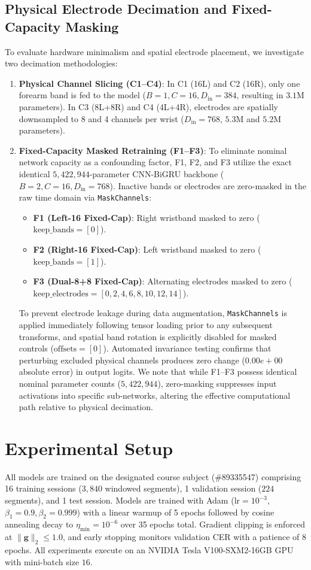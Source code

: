 \documentclass{article}
\begin{document}
\subsection{Physical Electrode Decimation and Fixed-Capacity Masking}
To evaluate hardware minimalism and spatial electrode placement, we investigate two decimation methodologies:
\begin{enumerate}
    \item \textbf{Physical Channel Slicing (C1--C4)}: In C1 (16L) and C2 (16R), only one forearm band is fed to the model ($B=1, C=16, D_{\text{in}}=384$, resulting in $3.1\text{M}$ parameters). In C3 (8L+8R) and C4 (4L+4R), electrodes are spatially downsampled to 8 and 4 channels per wrist ($D_{\text{in}}=768$, $5.3\text{M}$ and $5.2\text{M}$ parameters).
    \item \textbf{Fixed-Capacity Masked Retraining (F1--F3)}: To eliminate nominal network capacity as a confounding factor, F1, F2, and F3 utilize the exact identical $5{,}422{,}944$-parameter CNN-BiGRU backbone ($B=2, C=16, D_{\text{in}}=768$). Inactive bands or electrodes are zero-masked in the raw time domain via \texttt{MaskChannels}:
    \begin{itemize}
        \item \textbf{F1 (Left-16 Fixed-Cap)}: Right wristband masked to zero ($\text{keep\_bands}=[0]$).
        \item \textbf{F2 (Right-16 Fixed-Cap)}: Left wristband masked to zero ($\text{keep\_bands}=[1]$).
        \item \textbf{F3 (Dual-8+8 Fixed-Cap)}: Alternating electrodes masked to zero ($\text{keep\_electrodes}=[0, 2, 4, 6, 8, 10, 12, 14]$).
    \end{itemize}
    To prevent electrode leakage during data augmentation, \texttt{MaskChannels} is applied immediately following tensor loading prior to any subsequent transforms, and spatial band rotation is explicitly disabled for masked controls ($\text{offsets}=[0]$). Automated invariance testing confirms that perturbing excluded physical channels produces zero change ($0.00e+00$ absolute error) in output logits. We note that while F1--F3 possess identical nominal parameter counts ($5{,}422{,}944$), zero-masking suppresses input activations into specific sub-networks, altering the effective computational path relative to physical decimation.
\end{enumerate}

\section{Experimental Setup}
\label{sec:setup}
All models are trained on the designated course subject (\#89335547) comprising 16 training sessions ($3{,}840$ windowed segments), 1 validation session ($224$ segments), and 1 test session. Models are trained with Adam ($\text{lr} = 10^{-3}$, $\beta_1=0.9, \beta_2=0.999$) with a linear warmup of 5 epochs followed by cosine annealing decay to $\eta_{\text{min}} = 10^{-6}$ over 35 epochs total. Gradient clipping is enforced at $\|\mathbf{g}\|_2 \le 1.0$, and early stopping monitors validation CER with a patience of 8 epochs. All experiments execute on an NVIDIA Tesla V100-SXM2-16GB GPU with mini-batch size $16$.
\end{document}
